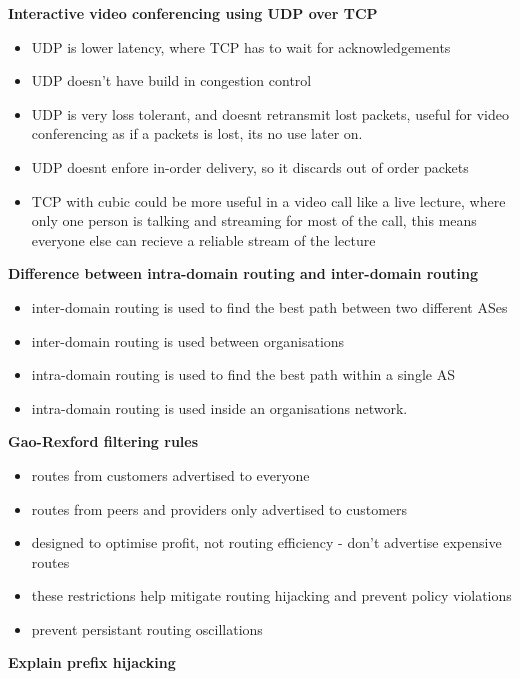 \documentclass{article}
\begin{document}
\textbf{Interactive video conferencing using UDP over TCP}
\begin{itemize}
    \item UDP is lower latency, where TCP has to wait for acknowledgements
    \item UDP doesn't have build in congestion control
    \item UDP is very loss tolerant, and doesnt retransmit lost packets, useful for video conferencing as if a packets is lost, its no use later on.
    \item UDP doesnt enfore in-order delivery, so it discards out of order packets
    \item TCP with cubic could be more useful in a video call like a live lecture, where only one person is talking and streaming for most of the call, this means everyone else can recieve a reliable stream of the lecture
\end{itemize}

\textbf{Difference between intra-domain routing and inter-domain routing}
\begin{itemize}
    \item inter-domain routing is used to find the best path between two different ASes
    \item inter-domain routing is used between organisations
    \item intra-domain routing is used to find the best path within a single AS
    \item intra-domain routing is used inside an organisations network.
\end{itemize}

\textbf{Gao-Rexford filtering rules}
\begin{itemize}
    \item routes from customers advertised to everyone
    \item routes from peers and providers only advertised to customers
    \item designed to optimise profit, not routing efficiency {-} don't advertise expensive routes
    \item these restrictions help mitigate routing hijacking and prevent policy violations
    \item prevent persistant routing oscillations %
\end{itemize}

\textbf{Explain prefix hijacking}
\end{document}
